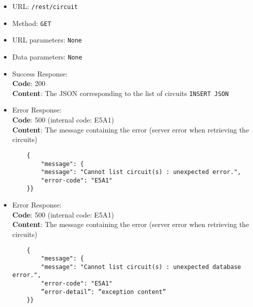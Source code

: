 \begin{itemize}
    \item URL: \texttt{/rest/circuit}
    \item Method: \texttt{GET}
    \item URL parameters: \texttt{None}
    \item Data parameters: \texttt{None}
    \item Success Response: \\
        \textbf{Code}: 200\\
        \textbf{Content}: The JSON corresponding to the list of circuits
        \texttt{INSERT JSON}
    \item Error Response:\\
    \textbf{Code}: 500 (internal code: E5A1)\\
    \textbf{Content}: The message containing the error (server error when retrieving the circuits)\\
    \begin{verbatim}
    {
        "message": {
        "message": "Cannot list circuit(s) : unexpected error.",
        "error-code": "E5A1"
    }}
    \end{verbatim}
    \item Error Response:\\
    \textbf{Code}: 500 (internal code: E5A1)\\
    \textbf{Content}: The message containing the error (server error when retrieving the circuits)\\
    \begin{verbatim}
    {
        "message": {
        "message": "Cannot list circuit(s) : unexpected database error.",
        "error-code": "E5A1"
        ”error-detail”: ”exception content”
    }}
    \end{verbatim}
    
\end{itemize}
